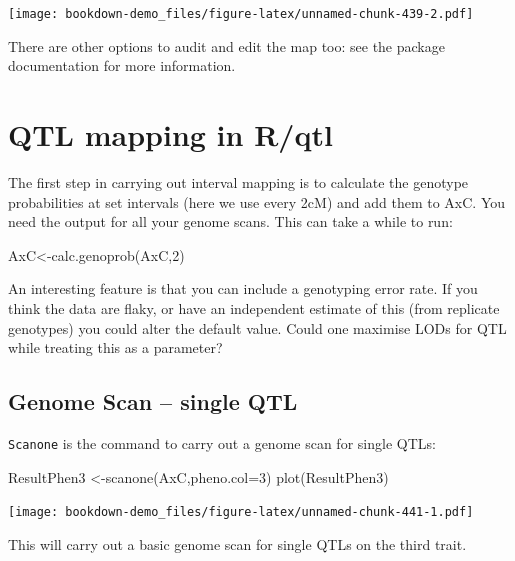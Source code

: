 \documentclass[
]{book}
\newenvironment{Shaded}{\begin{snugshade}}{\end{snugshade}}
\newcommand{\AttributeTok}[1]{\textcolor[rgb]{0.77,0.63,0.00}{#1}}
\newcommand{\DecValTok}[1]{\textcolor[rgb]{0.00,0.00,0.81}{#1}}
\newcommand{\FunctionTok}[1]{\textcolor[rgb]{0.00,0.00,0.00}{#1}}
\newcommand{\NormalTok}[1]{#1}
\newcommand{\OtherTok}[1]{\textcolor[rgb]{0.56,0.35,0.01}{#1}}
\begin{document}
\texttt{[image: bookdown-demo\_files/figure-latex/unnamed-chunk-439-2.pdf]}

There are other options to audit and edit the map too: see the package documentation for more information.

\hypertarget{qtl-mapping-in-rqtl}{%
\section{QTL mapping in R/qtl}\label{qtl-mapping-in-rqtl}}

The first step in carrying out interval mapping is to calculate the genotype probabilities at set intervals (here we use every 2cM) and add them to AxC. You need the output for all your genome scans. This can take a while to run:

\begin{Shaded}
\begin{Highlighting}[]
\NormalTok{AxC}\OtherTok{\textless{}{-}}\FunctionTok{calc.genoprob}\NormalTok{(AxC,}\DecValTok{2}\NormalTok{) }
\end{Highlighting}
\end{Shaded}

An interesting feature is that you can include a genotyping error rate. If you think the data are flaky, or have an independent estimate of this (from replicate genotypes) you could alter the default value. Could one maximise LODs for QTL while treating this as a parameter?

\hypertarget{genome-scan-single-qtl}{%
\subsection{Genome Scan -- single QTL}\label{genome-scan-single-qtl}}

\texttt{Scanone} is the command to carry out a genome scan for single QTLs:

\begin{Shaded}
\begin{Highlighting}[]
\NormalTok{ResultPhen3 }\OtherTok{\textless{}{-}}\FunctionTok{scanone}\NormalTok{(AxC,}\AttributeTok{pheno.col=}\DecValTok{3}\NormalTok{) }
\FunctionTok{plot}\NormalTok{(ResultPhen3)}
\end{Highlighting}
\end{Shaded}

\texttt{[image: bookdown-demo\_files/figure-latex/unnamed-chunk-441-1.pdf]}

This will carry out a basic genome scan for single QTLs on the third trait.
\end{document}
